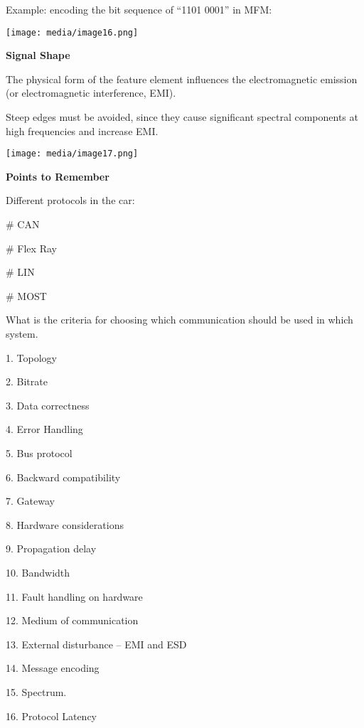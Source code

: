 Example: encoding the bit sequence of ``1101 0001'' in MFM:

\texttt{[image: media/image16.png]}

\textbf{Signal Shape}

The physical form of the feature element influences the electromagnetic
emission (or electromagnetic interference, EMI).

Steep edges must be avoided, since they cause significant spectral
components at high frequencies and increase EMI.

\texttt{[image: media/image17.png]}

\protect\hypertarget{teil9}{}{}\textbf{Points to Remember}

Different protocols in the car:

\# CAN

\# Flex Ray

\# LIN

\# MOST

What is the criteria for choosing which communication should be used in
which system.

1. Topology

2. Bitrate

3. Data correctness

4. Error Handling

5. Bus protocol

6. Backward compatibility

7. Gateway

8. Hardware considerations

9. Propagation delay

10. Bandwidth

11. Fault handling on hardware

12. Medium of communication

13. External disturbance -- EMI and ESD

14. Message encoding

15. Spectrum.

16. Protocol Latency
